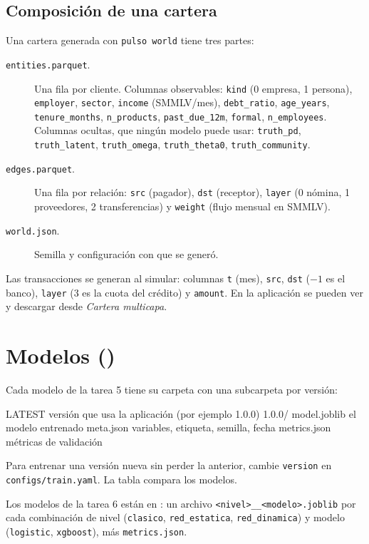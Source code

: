 \subsection*{Composición de una cartera}
Una cartera generada con \texttt{pulso world} tiene tres partes:
\begin{description}
\item[\texttt{entities.parquet}.] Una fila por cliente. Columnas observables:
\texttt{kind} (0 empresa, 1 persona), \texttt{employer}, \texttt{sector},
\texttt{income} (SMMLV/mes), \texttt{debt\_ratio}, \texttt{age\_years},
\texttt{tenure\_months}, \texttt{n\_products}, \texttt{past\_due\_12m}, \texttt{formal},
\texttt{n\_employees}. Columnas ocultas, que ningún modelo puede usar:
\texttt{truth\_pd}, \texttt{truth\_latent}, \texttt{truth\_omega},
\texttt{truth\_theta0}, \texttt{truth\_community}.
\item[\texttt{edges.parquet}.] Una fila por relación: \texttt{src} (pagador),
\texttt{dst} (receptor), \texttt{layer} (0 nómina, 1 proveedores, 2 transferencias) y
\texttt{weight} (flujo mensual en SMMLV).
\item[\texttt{world.json}.] Semilla y configuración con que se generó.
\end{description}
Las transacciones se generan al simular: columnas \texttt{t} (mes), \texttt{src},
\texttt{dst} ($-1$ es el banco), \texttt{layer} (3 es la cuota del crédito) y
\texttt{amount}. En la aplicación se pueden ver y descargar desde \emph{Cartera
multicapa}.

\section{Modelos ()}
Cada modelo de la tarea 5 tiene su carpeta con una subcarpeta por versión:
\begin{archivo}[label=models/xgb\_collapse/]
LATEST            versión que usa la aplicación (por ejemplo 1.0.0)
1.0.0/
  model.joblib    el modelo entrenado
  meta.json       variables, etiqueta, semilla, fecha
  metrics.json    métricas de validación
\end{archivo}
Para entrenar una versión nueva sin perder la anterior, cambie \texttt{version} en
\texttt{configs/train.yaml}. La tabla  compara los modelos.

Los modelos de la tarea 6 están en : un archivo
\texttt{<nivel>\_\_<modelo>.joblib} por cada combinación de nivel (\texttt{clasico},
\texttt{red\_estatica}, \texttt{red\_dinamica}) y modelo (\texttt{logistic},
\texttt{xgboost}), más \texttt{metrics.json}.

